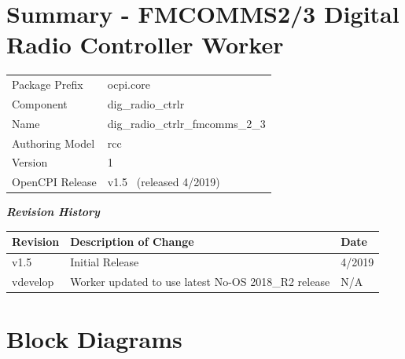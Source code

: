 \documentclass{article}
\author{} %
\date{Version \docVersion} %
\title{\docTitle}
\def\docVersion{1.5}
\def\comp{dig\_radio\_ctrlr\_fmcomms\_2\_3}
\begin{document}
\section*{Summary - FMCOMMS2/3 Digital Radio Controller Worker}
\begin{longtable}{|p{}
                  |p{}|}
	\hline
	\rowcolor{blue}
	                  &                                        \\
	\hline
	Package Prefix    & ocpi.core \\
	\hline
	Component         & dig\_radio\_ctrlr \\
	\hline
	Name              & \comp                                  \\
	\hline
	Authoring Model   & rcc                                    \\
	\hline
	Version          & 1 \\
	\hline
	OpenCPI Release & v\docVersion ~ (released 4/2019) \\
	\hline
\end{longtable}

\begin{center}
  \textit{\textbf{Revision History}}
  \begin{longtable}{|p{}
                    |p{}
                    |p{}|}
    \hline
    \rowcolor{blue}
    \textbf{Revision} & \textbf{Description of Change} & \textbf{Date} \\
    \hline
    v1.5 & Initial Release & 4/2019 \\
    \hline
    \color{red}vdevelop & \item Worker updated to use latest No-OS 2018\_R2 release & N/A \\
    \hline
  \end{longtable}
\end{center}

\section{Block Diagrams}
\end{document}
